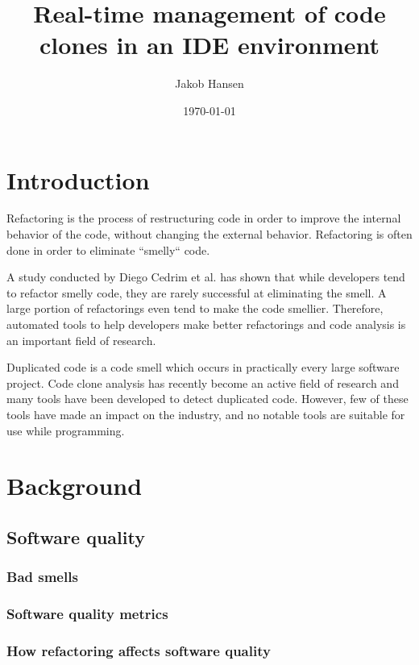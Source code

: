 \documentclass[12pt]{article}
\title{Real-time management of code clones in an IDE environment}
\author{Jakob Hansen}
\date{\today}
\begin{document}
\maketitle

\tableofcontents

\section{Introduction}

Refactoring is the process of restructuring code in order to improve the internal behavior
of the code, without changing the external behavior.\cite{fowlerrefactoring} Refactoring
is often done in order to eliminate ``smelly`` code.

A study conducted by Diego Cedrim et al.\cite{Rohit_Gheyi_Impact} has shown that
while developers tend to refactor smelly code, they are rarely successful at eliminating
the smell. A large portion of refactorings even tend to make the code smellier. Therefore,
automated tools to help developers make better refactorings and code analysis is an
important field of research.

Duplicated code is a code smell which occurs in practically every large software project.
Code clone analysis has recently become an active field of research and many tools have
been developed to detect duplicated code.\cite{Inoue_introduction_to_cc} However, few of
these tools have made an impact on the industry, and no notable tools are suitable for use
while programming.

\section{Background}

\subsection{Software quality}

\subsubsection{Bad smells}

\subsubsection{Software quality metrics}

\subsubsection{How refactoring affects software quality}
\end{document}
